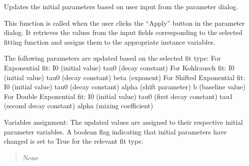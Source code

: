 \documentclass[letterpaper,10pt,english]{sphinxmanual}
\begin{document}
\begin{fulllineitems}
\begin{fulllineitems}
\begin{quote}
\begin{description}
\end{description}\end{quote}

\end{fulllineitems}


\begin{fulllineitems}
\label{\detokenize{FLIMGraphics:FLIMGraphics.FLIMGraphic.applyInitialDialog}}
\pysigstartsignatures
{}
\pysigstopsignatures
\sphinxAtStartPar
Updates the initial parameters based on user input from the parameter dialog.

\sphinxAtStartPar
This function is called when the user clicks the “Apply” button in the parameter dialog. 
It retrieves the values from the input fields corresponding to the selected fitting function 
and assigns them to the appropriate instance variables.

\sphinxAtStartPar
The following parameters are updated based on the selected fit type:
\sphinxhyphen{} For Exponential fit:
\sphinxhyphen{} I0 (initial value)
\sphinxhyphen{} tau0 (decay constant)
\sphinxhyphen{} For Kohlrausch fit:
\sphinxhyphen{} I0 (initial value)
\sphinxhyphen{} tau0 (decay constant)
\sphinxhyphen{} beta (exponent)
\sphinxhyphen{} For Shifted Exponential fit:
\sphinxhyphen{} I0 (initial value)
\sphinxhyphen{} tau0 (decay constant)
\sphinxhyphen{} alpha (shift parameter)
\sphinxhyphen{} b (baseline value)
\sphinxhyphen{} For Double Exponential fit:
\sphinxhyphen{} I0 (initial value)
\sphinxhyphen{} tau0 (first decay constant)
\sphinxhyphen{} tau1 (second decay constant)
\sphinxhyphen{} alpha (mixing coefficient)

\sphinxAtStartPar
Variables assignment:
\sphinxhyphen{} The updated values are assigned to their respective initial parameter variables.
\sphinxhyphen{} A boolean flag indicating that initial parameters have changed is set to True for the relevant fit type.
\begin{quote}\begin{description}
\sphinxAtStartPar
None

\end{description}\end{quote}

\end{fulllineitems}


\end{fulllineitems}
\end{document}

